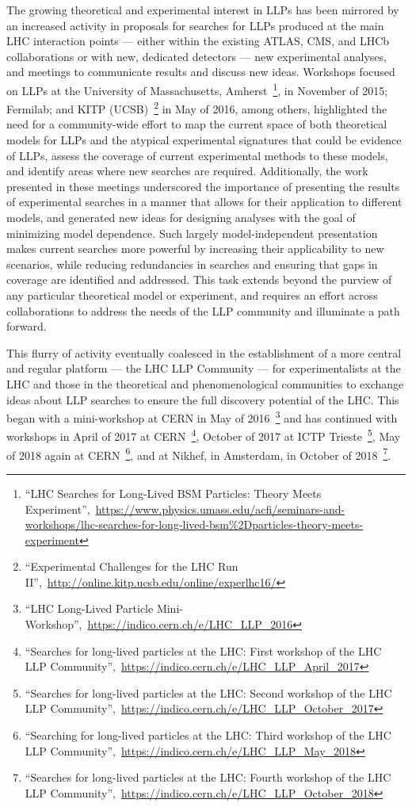 The growing theoretical and experimental interest in LLPs has been mirrored by an increased activity in proposals for searches for LLPs produced at the main LHC interaction points --- either within the existing ATLAS, CMS, and LHCb collaborations or with new, dedicated detectors --- new experimental analyses, and meetings to communicate results and discuss new ideas.
Workshops focused on LLPs at the University of Massachusetts, Amherst~\footnote{``LHC Searches for Long-Lived BSM Particles: Theory Meets Experiment'',~\url{https://www.physics.umass.edu/acfi/seminars-and-workshops/lhc-searches-for-long-lived-bsm\%2Dparticles-theory-meets-experiment}}, in November of 2015; Fermilab; and KITP (UCSB)~\footnote{``Experimental Challenges for the LHC Run II'',~\url{http://online.kitp.ucsb.edu/online/experlhc16/}} in May of 2016, among others, highlighted the need for a community-wide effort to map the current space of both theoretical models for LLPs and the atypical experimental signatures that could be evidence of LLPs, assess the coverage of current experimental methods to these models, and identify areas where new searches are required.
Additionally, the work presented in these meetings underscored the importance of presenting the results of experimental searches in a manner that allows for their application to different models, and generated new ideas for designing analyses with the goal of minimizing model dependence.
Such largely model-independent presentation makes current searches more powerful by increasing their applicability to new scenarios, while reducing redundancies in searches and ensuring that gaps in coverage are identified and addressed.
This task extends beyond the purview of any particular theoretical model or experiment, and requires an effort across collaborations to address the needs of the LLP community and illuminate a path forward.

This flurry of activity eventually coalesced in the establishment of a more central and regular platform --- the LHC LLP Community --- for experimentalists at the LHC and those in the theoretical and phenomenological communities to exchange ideas about LLP searches to ensure the full discovery potential of the LHC.
This began with a mini-workshop at CERN in May of 2016~\footnote{``LHC Long-Lived Particle Mini-Workshop'',~\url{https://indico.cern.ch/e/LHC_LLP_2016}} and has continued with workshops in April of 2017 at CERN~\footnote{``Searches for long-lived particles at the LHC: First workshop of the LHC LLP Community'',~\url{https://indico.cern.ch/e/LHC_LLP_April_2017}}, October of 2017 at ICTP Trieste~\footnote{``Searches for long-lived particles at the LHC: Second workshop of the LHC LLP Community'',~\url{https://indico.cern.ch/e/LHC_LLP_October_2017}}, May of 2018 again at CERN~\footnote{``Searching for long-lived particles at the LHC: Third workshop of the LHC LLP Community'',~\url{https://indico.cern.ch/e/LHC_LLP_May_2018}}, and at Nikhef, in Amsterdam, in October of 2018~\footnote{``Searches for long-lived particles at the LHC: Fourth workshop of the LHC LLP Community'',~\url{https://indico.cern.ch/e/LHC_LLP_October_2018}}.

